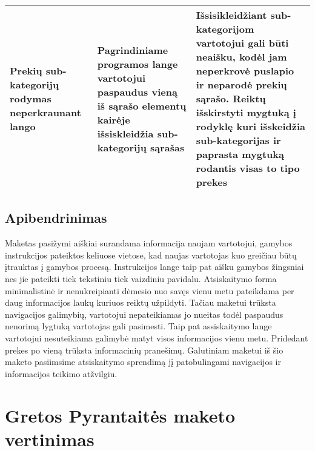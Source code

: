 \documentclass[oneside]{VUMIFPSkursinis}
\begin{document}
\begin{center}
\begin{tabular}{ |p{4cm}| p{6cm} | p{7cm} | }
	Prekių sub-kategorijų rodymas neperkraunant lango & Pagrindiniame programos lange vartotojui paspaudus vieną iš sąrašo elementų kairėje išsiskleidžia sub-kategorijų sąrašas & Išsisikleidžiant sub-kategorijom vartotojui gali būti neaišku, kodėl jam neperkrovė puslapio ir neparodė prekių sąrašo. Reiktų išskirstyti mygtuką į rodyklę kuri išskeidžia sub-kategorijas ir paprasta mygtuką rodantis visas to tipo prekes \\ \hline

   \hline
    \end{tabular}
\end{center}
	\subsection{Apibendrinimas}
Maketas pasižymi aiškiai surandama informacija naujam vartotojui, gamybos instrukcijos pateiktos keliuose vietose, kad naujas vartotojas kuo greičiau būtų įtrauktas į gamybos procesą. Instrukcijos lange taip pat aišku gamybos žingsniai nes jie pateikti tiek tekstiniu tiek vaizdiniu pavidalu. Atsiskaitymo forma minimalistinė ir nenukreipianti dėmesio nuo savęs vienu metu pateikdama per daug informacijos laukų kuriuos reiktų užpildyti. Tačiau maketui trūksta navigacijos galimybių, vartotojui nepateikiamas jo nueitas todėl paspaudus nenorimą lygtuką vartotojas gali pasimesti. Taip pat assiskaitymo lange vartotojui nesuteikiama galimybė matyt visos informacijos vienu metu. Pridedant prekes po vieną trūksta informacinių pranešimų. Galutiniam maketui iš šio maketo pasiimsime atsiskaitymo sprendimą jį patobulingami navigacijos ir informacijos teikimo atžvilgiu.
\iffalse XXXXXXXXXXXXXXXXXXXXXXXXXXXXXXXXXXXXXXXXXXXXXXXXXXXXXXXXXXXXXXXXXXXXXXXXXXXXXXXXXXXXXXXXXXXXXXXXXXXXXXXXXXXXXXXXXXXXXXXXXXXXXXXXXXXXXXX \fi
\section{Gretos Pyrantaitės maketo vertinimas}
\end{document}
